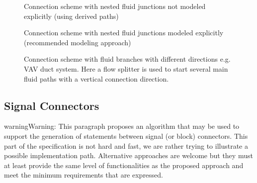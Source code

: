 \documentclass[letterpaper,10pt, openany,english]{sphinxmanual}
\begin{document}
\begin{figure}[htbp]
\centering
\capstart

\noindent{}
\caption{Connection scheme with nested fluid junctions not modeled explicitly (using derived paths)}\label{\detokenize{requirements:linkage-connect-multi}}\end{figure}

\begin{figure}[htbp]
\centering
\capstart

\noindent{}
\caption{Connection scheme with nested fluid junctions modeled explicitly (recommended modeling approach)}\label{\detokenize{requirements:linkage-connect-multi-exp}}\end{figure}

\begin{figure}[htbp]
\centering
\capstart

\noindent{}
\caption{Connection scheme with fluid branches with different directions e.g. VAV duct system. Here a flow splitter is used to start several main fluid paths with a vertical connection direction.}\label{\detokenize{requirements:linkage-connect-duct}}\end{figure}


\subsection{Signal Connectors}
\label{\detokenize{requirements:signal-connectors}}\label{\detokenize{requirements:sec-signal-connectors}}
\begin{sphinxadmonition}{warning}{Warning:}
This paragraph proposes an algorithm that may be used to support the generation of  statements between signal (or block) connectors. This part of the specification is not hard and fast, we are rather trying to illustrate a possible implementation path. Alternative approaches are welcome but they must at least provide the same level of functionalities as the proposed approach and meet the minimum requirements that are expressed.
\end{sphinxadmonition}
\end{document}
